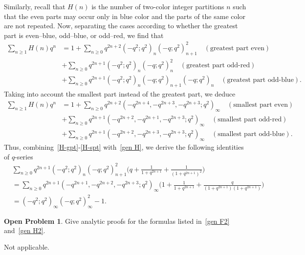 \documentclass{amsart}
\numberwithin{equation}{section}
\theoremstyle{definition}
\newtheorem{problem}{Open Problem}
\newcommand{\fr}{\frac}
\begin{document}
Similarly,  recall that $H(n)$ is the number of two-color integer partitions $n$
such that the even parts may occur only in blue color and the parts of the same color are not repeated.
%
Now, separating the cases according to whether the greatest part is even--blue, odd--blue, or odd--red, we find that
\begin{align}
\sum_{n\geq 1} H(n)q^n &= 1+ \sum_{n\geq 0}q^{2n+2}(-q^2;q^2)_{n} (-q;q^2)_{n+1}^2 \quad (\text{greatest part even}) \nonumber \\
&+ \sum_{n\geq 0} q^{2n+1}(-q^2;q^2)_n (-q;q^2)_{n}^2 \quad (\text{greatest part odd-red}) \nonumber \\
&+ \sum_{n\geq 0} q^{2n+1}(-q^2;q^2)_n (-q;q^2)_{n+1}(-q;q^2)_{n} \quad (\text{greatest part odd-blue}).\label{H-gpt}
\end{align}
Taking into account the smallest part instead of the greatest part, we deduce
\begin{align}
\sum_{n\geq 1} H(n)q^n &= 1+ \sum_{n\geq 0}q^{2n+2}(-q^{2n+4},-q^{2n+3},-q^{2n+3};q^2)_{\infty} \quad (\text{smallest part even}) \nonumber \\
&+ \sum_{n\geq 0} q^{2n+1}(-q^{2n+2},-q^{2n+1},-q^{2n+3};q^2)_{\infty} \quad (\text{smallest part odd-red}) \nonumber \\
&+ \sum_{n\geq 0} q^{2n+1}(-q^{2n+2},-q^{2n+3},-q^{2n+3};q^2)_{\infty} \quad (\text{smallest part odd-blue}).\label{H-spt}
\end{align}
Thus, combining~\eqref{H-gpt}-\eqref{H-spt} with~\eqref{gen H}, we derive the following identities of $q$-series
\begin{align}
& \sum_{n\geq 0}q^{2n+1}(-q^2;q^2)_{n} (-q;q^2)_{n+1}^2
\Big( q+\fr{1}{1+q^{2n+1}}+\fr{1}{(1+q^{2n+1})^2} \Big) \nonumber \\
&=\sum_{n\geq 0} q^{2n+1} (-q^{2n+1},-q^{2n+2},-q^{2n+3};q^2)_\infty \Big(1+\fr{1}{1+q^{2n+1}}+\fr{q}{(1+q^{2n+1})(1+q^{2n+1})} \Big) \nonumber \\
&=(-q^2;q^2)_\infty (-q;q^2)_{\infty}^2 -1. \label{gen H2}
\end{align}
%
\begin{problem}
Give analytic proofs for the formulas listed in~\eqref{gen F2} and~\eqref{gen H2}.
\end{problem}
%

\medskip
{} Not applicable.
\end{document}
